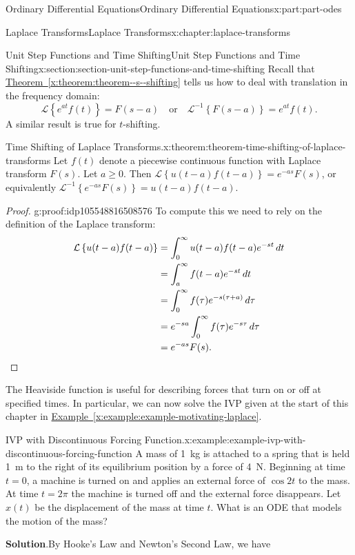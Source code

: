 \documentclass[twoside,10pt,]{book}
\newcommand{\blocktitlefont}{\relax}
\newcommand{\xreffont}{\relax}
\numberwithin{equation}{part}
\newcommand{\qedhere}{\relax}
\newcommand{\Laplace}[1]{\mathcal{L}\left\{#1\right\}}
\newcommand{\iLaplace}[1]{\mathcal{L}^{-1}\left\{#1\right\}}
\newcommand{\amp}{&}
\begin{document}
\begin{partptx}{Ordinary Differential Equations}{}{Ordinary Differential Equations}{}{}{x:part:part-odes}
\begin{chapterptx}{Laplace Transforms}{}{Laplace Transforms}{}{}{x:chapter:laplace-transforms}
\begin{sectionptx}{Unit Step Functions and Time Shifting}{}{Unit Step Functions and Time Shifting}{}{}{x:section:section-unit-step-functions-and-time-shifting}
Recall that \hyperref[x:theorem:theorem--s--shifting]{Theorem~{\xreffont\ref{x:theorem:theorem--s--shifting}}} tells us how to deal with translation in the frequency domain:%
\begin{equation*}
\Laplace{e^{at}f(t)} = F(s-a) \quad\text{or}\quad\iLaplace{F(s-a)} = e^{at}f(t).
\end{equation*}
A similar result is true for \(t\)-shifting.%
\begin{theorem}{Time Shifting of Laplace Transforms.}{}{x:theorem:theorem-time-shifting-of-laplace-transforms}%
Let \(f(t)\) denote a piecewise continuous function with Laplace transform \(F(s)\). Let \(a\geq0\). Then \(\Laplace{u(t-a)f(t-a)} = e^{-as}F(s)\), or equivalently \(\iLaplace{e^{-as}F(s)} = u(t-a)f(t-a)\).%
\end{theorem}
\begin{proof}{}{g:proof:idp105548816508576}
To compute this we need to rely on the definition of the Laplace transform:%
\begin{align*}
\Laplace{u(t-a)f(t-a)} \amp= \int_{0}^{\infty}u(t-a)f(t-a)e^{-st}\,dt\\
\amp= \int_{a}^{\infty}f(t-a)e^{-st}\,dt\\
\amp= \int_{0}^{\infty}f(\tau)e^{-s(\tau+a)}\,d\tau\\
\amp= e^{-sa}\int_{0}^{\infty}f(\tau)e^{-s\tau}\,d\tau\\
\amp= e^{-as}F(s)\text{.}\qedhere
\end{align*}
%
\end{proof}
The Heaviside function is useful for describing forces that turn on or off at specified times. In particular, we can now solve the IVP given at the start of this chapter in \hyperref[x:example:example-motivating-laplace]{Example~{\xreffont\ref{x:example:example-motivating-laplace}}}.%
\begin{example}{IVP with Discontinuous Forcing Function.}{x:example:example-ivp-with-discontinuous-forcing-function}%
A mass of \SI{1}{\kilogram} is attached to a spring that is held \SI{1}{\meter} to the right of its equilibrium position by a force of \SI{4}{\newton}. Beginning at time \(t=0\), a machine is turned on and applies an external force of \(\cos2t\) to the mass. At time \(t=2\pi\) the machine is turned off and the external force disappears. Let \(x(t)\) be the displacement of the mass at time \(t\). What is an ODE that models the motion of the mass?%
\par\smallskip%
\noindent\textbf{\blocktitlefont Solution}.\hypertarget{g:solution:idp105548816516384}{}\quad{}By Hooke's Law and Newton's Second Law, we have%

\end{example}
\end{sectionptx}
\end{chapterptx}
\end{partptx}
\end{document}
